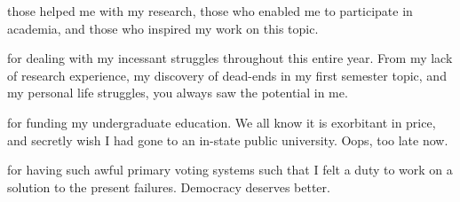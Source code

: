 
 those helped me with my research, those who enabled me to participate in academia, and those who inspired my work on this topic.

 for dealing with my incessant struggles throughout this entire year. From my lack of research experience, my discovery of dead-ends in my first semester topic, and my personal life struggles, you always saw the potential in me.

 for funding my undergraduate education. We all know it is exorbitant in price, and secretly wish I had gone to an in-state public university. Oops, too late now.

 for having such awful primary voting systems such that I felt a duty to work on a solution to the present failures. Democracy deserves better.
